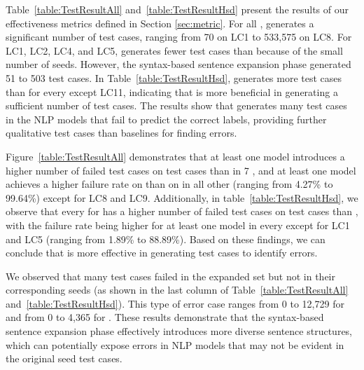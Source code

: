 Table~\ref{table:TestResultAll} and~\ref{table:TestResultHsd} present the results of our effectiveness metrics defined in Section \ref{sec:metric}.  For all \lcs, \tool generates a significant number of test cases, ranging from 70 on LC1 to 533,575 on LC8.
For LC1, LC2, LC4, and LC5, \tool generates fewer test cases than \Cklst because of the small number of seeds. However, the syntax-based sentence expansion phase generated 51 to 503 test cases. In Table~\ref{table:TestResultHsd}, \tool generates more test cases than \hck for every \lcs except LC11, indicating that \tool is more beneficial in generating a sufficient number of test cases. The results show that \tool generates many test cases in the NLP models that fail to predict the correct labels, providing further qualitative test cases than baselines for finding errors.

Figure~\ref{table:TestResultAll} demonstrates that at least one model introduces a higher number of failed test cases on \tool test cases than \Cklst in 7 \lcs, and at least one model achieves a higher failure rate on \tool than on \Cklst in all other \lcs (ranging from 4.27\% to 99.64\%) except for LC8 and LC9. Additionally, in table~\ref{table:TestResultHsd}, we observe that every \lcs for \hsd has a higher number of failed test cases on \tool test cases than \hck, with the failure rate being higher for at least one model in every \lcs except for LC1 and LC5 (ranging from 1.89\% to 88.89\%). Based on these findings, we can conclude that \tool is more effective in generating test cases to identify  errors.


 We observed that many test cases failed in the expanded set but not in their corresponding seeds (as shown in the last column of Table~\ref{table:TestResultAll} and~\ref{table:TestResultHsd}). This type of error case ranges from 0 to 12,729 for \sa and from 0 to 4,365 for \hsd. These results demonstrate that the syntax-based sentence expansion phase effectively introduces more diverse sentence structures, which can potentially expose errors in NLP models that may not be evident in the original seed test cases.

